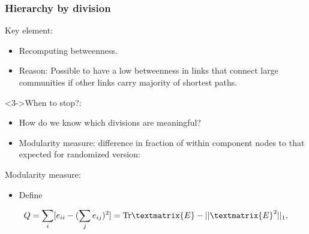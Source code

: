 \begin{frame}
  \frametitle{Hierarchy by division}

  \begin{block}{Key element:}
    \begin{itemize}
    \item<1-> 
      Recomputing betweenness.
    \item<2-> 
      \alert{Reason:} Possible to have a low betweenness
      in links that connect large communities
      if other links carry majority of shortest paths.
    \end{itemize}
  \end{block}

  \begin{block}<3->{When to stop?:}
    \begin{itemize}
    \item<4-> 
      How do we know which
      divisions are meaningful?
    \item<5-> 
      \alert{Modularity measure:}
      difference in fraction of within component
      nodes to that expected for randomized version:\\
      \smallskip
    \end{itemize}
  \end{block}

\end{frame}

\begin{frame}

  \begin{block}{Modularity measure:}
    \begin{itemize}
    \item 
      Define 
    \end{itemize}

    $$  
    Q = 
    \sum_{i}
    [e_{ii} - (\sum_j e_{ij})^2]
    =
    {\textnormal{Tr}} \textmatrix{E} - || \textmatrix{E}^2 ||_1,
    $$
  \end{block}

\end{frame}


